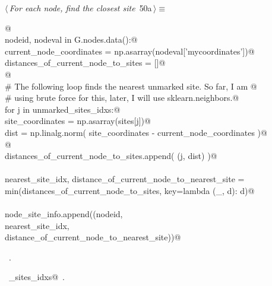 \documentclass[11.5pt]{report}
\begin{document}
\vspace{-0.8cm} \newchunk
\begin{flushleft} \small
\begin{minipage}{\linewidth}\label{scrap77}\raggedright\small
{} $\langle\,${\itshape For each node, find the closest site}\nobreak\ {\footnotesize {50a}}$\,\rangle\equiv$
\vspace{-1ex}
\begin{list}{}{} \item
\mbox{}\verb@   @\\
\mbox{}\verb@for nodeid, nodeval in G.nodes.data():@\\
\mbox{}\verb@    current_node_coordinates = np.asarray(nodeval['mycoordinates'])@\\
\mbox{}\verb@    distances_of_current_node_to_sites = []@\\
\mbox{}\verb@               @\\
\mbox{}\verb@    # The following loop finds the nearest unmarked site. So far, I am @\\
\mbox{}\verb@    # using brute force for this, later, I will use sklearn.neighbors.@\\
\mbox{}\verb@    for j in unmarked_sites_idxs:@\\
\mbox{}\verb@        site_coordinates = np.asarray(sites[j])@\\
\mbox{}\verb@        dist             =  np.linalg.norm( site_coordinates - current_node_coordinates )@\\
\mbox{}\verb@                    @\\
\mbox{}\verb@        distances_of_current_node_to_sites.append( (j, dist) )@\\
\mbox{}\verb@@\\
\mbox{}\verb@        nearest_site_idx, distance_of_current_node_to_nearest_site = \@\\
\mbox{}\verb@                        min(distances_of_current_node_to_sites, key=lambda (_, d): d)@\\
\mbox{}\verb@@\\
\mbox{}\verb@        node_site_info.append((nodeid, \@\\
\mbox{}\verb@                                  nearest_site_idx, \@\\
\mbox{}\verb@                                  distance_of_current_node_to_nearest_site))@\\
\mbox{}\verb@@{\NWsep}
\end{list}
\vspace{-1.5ex}
\footnotesize
\begin{list}{}{\setlength{\itemsep}{-\parsep}\setlength{\itemindent}{-\leftmargin}}
\item \NWtxtMacroRefIn\ .
\item \NWtxtIdentsUsed\nobreak\  \verb@unmarked_sites_idxs@\nobreak\ .
\item{}
\end{list}
\end{minipage}\vspace{4ex}
\end{flushleft}
\end{document}
